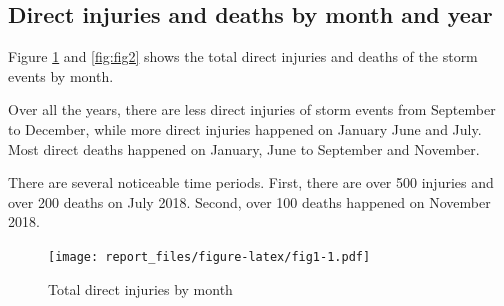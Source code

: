 \documentclass[
]{article}
\newenvironment{Shaded}{\begin{snugshade}}{\end{snugshade}}
\newcommand{\DataTypeTok}[1]{\textcolor[rgb]{0.13,0.29,0.53}{#1}}
\newcommand{\KeywordTok}[1]{\textcolor[rgb]{0.13,0.29,0.53}{\textbf{#1}}}
\newcommand{\NormalTok}[1]{#1}
\newcommand{\OperatorTok}[1]{\textcolor[rgb]{0.81,0.36,0.00}{\textbf{#1}}}
\newcommand{\OtherTok}[1]{\textcolor[rgb]{0.56,0.35,0.01}{#1}}
\newcommand{\StringTok}[1]{\textcolor[rgb]{0.31,0.60,0.02}{#1}}
\begin{document}
\hypertarget{direct-injuries-and-deaths-by-month-and-year}{%
\subsection{Direct injuries and deaths by month and year}\label{direct-injuries-and-deaths-by-month-and-year}}

Figure \ref{fig:fig1} and \ref{fig:fig2} shows the total direct injuries and deaths of the storm events by month.

Over all the years, there are less direct injuries of storm events from September to December, while more direct injuries happened on January June and July. Most direct deaths happened on January, June to September and November.

There are several noticeable time periods. First, there are over 500 injuries and over 200 deaths on July 2018. Second, over 100 deaths happened on November 2018.

\begin{Shaded}
\end{Shaded}

\begin{figure}
\centering
\texttt{[image: report\_files/figure-latex/fig1-1.pdf]}
\caption{\label{fig:fig1}Total direct injuries by month}
\end{figure}
\end{document}
